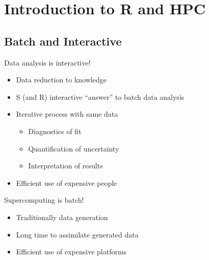 \section{Introduction to R and HPC}
\makesubcontentsslides

\subsection{Batch and Interactive}

\begin{frame}
  \begin{block}{Data analysis is interactive!}
    \pause
    \begin{itemize}[<+-|alert@+>]
    \item Data reduction to knowledge
    \item S (and R) interactive ``answer'' to batch data analysis
    \item Iterative process with same data
      \begin{itemize}
      \item Diagnostics of fit
      \item Quantification of uncertainty
      \item Interpretation of results
      \end{itemize}
    \item Efficient use of expensive people
    \end{itemize}
  \end{block}
  \begin{block}{Supercomputing is batch!}
    \pause
    \begin{itemize}[<+-|alert@+>]
    \item Traditionally data generation
    \item Long time to assimilate generated data
    \item Efficient use of expensive platforms
    \end{itemize}
  \end{block}
\end{frame}





